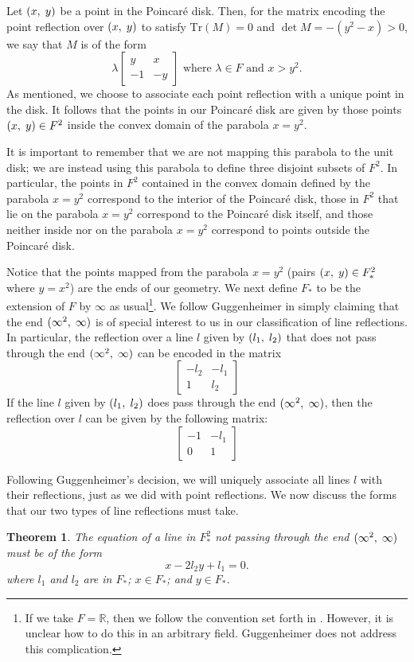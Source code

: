 \documentclass[12pt]{article}
\newcommand{\R}{\mathbb{R}}
\newcommand{\lftmat}[4]{\begin{bmatrix} {#1} & {#2} \\ {#3} & {#4} \end{bmatrix}}
\newcommand{\pointmat}[2]{\lftmat{{#2}}{{#1}}{-1}{-{#2}}}
\newcommand{\stanpointmat}{\pointmat{x}{y}}
\newcommand{\linenoendmat}[2]{\begin{bmatrix} -{#2} & -{#1} \\ 1 & {#2} \end{bmatrix}}
\newcommand{\stanlinenoendmat}{\linenoendmat{l_1}{l_2}}
\newcommand{\lineendmat}[2]{\begin{bmatrix} -1 & -{#1} \\ 0 & 1 \end{bmatrix}}
\newcommand{\stanlineendmat}{\lineendmat{l_1}{l_2}}
\newcommand{\ttc}{, \hspace{1mm}}
\newcommand{\poincare}{Poincar\'{e} }
\newcommand{\Tr}{\text{Tr}}
\newcommand{\specialend}{(\infty^2\ttc\infty)}
\theoremstyle{plain}
\newtheorem{theorem}{Theorem}[section]
\theoremstyle{definition}
\begin{document}
Let $(x \ttc y)$ be a point in the \poincare disk. Then, for the matrix encoding the point reflection over $(x \ttc y)$ to satisfy $\Tr(M) = 0$ and $\det M = -(y^2 - x) > 0$, we say that $M$ is of the form
\begin{equation} 
	\lambda \stanpointmat \text{ where } \lambda \in F \text{ and } x > y^2. 
\end{equation}	
As mentioned, we choose to associate each point reflection with a unique point in the disk. It follows that the points in our \poincare disk are given by those points $(x \ttc y) \in F^2$ inside the convex domain of the parabola $x = y^2$.

It is important to remember that we are not mapping this parabola to the unit disk; we are instead using this parabola to define three disjoint subsets of $F^2$. In particular, the points in $F^2$ contained in the convex domain defined by the parabola $x=y^2$ correspond to the interior of the \poincare disk, those in $F^2$ that lie on the parabola $x=y^2$ correspond to the \poincare disk itself, and those neither inside nor on the parabola $x=y^2$ correspond to points outside the \poincare disk.

Notice that the points mapped from the parabola $x = y^2$ (pairs $(x \ttc y) \in F_*^2$ where $y = x^2$) are the ends of our geometry. We next define $F_*$ to be the extension of $F$ by $\infty$ as usual\footnote{If we take $F = \R$, then we follow the convention set forth in \cite{shuman_infinity}. However, it is unclear how to do this in an arbitrary field. Guggenheimer does not address this complication.}. We follow Guggenheimer in simply claiming that the end $\specialend$ is of special interest to us in our classification of line reflections. In particular, the reflection over a line $l$ given by $(l_1\ttc l_2)$ that does not pass through the end $\specialend$ can be encoded in the matrix
\[\stanlinenoendmat\]
If the line $l$ given by $(l_1\ttc l_2)$ does pass through the end $\specialend$, then the reflection over $l$ can be given by the following matrix:
\[
	\stanlineendmat
\]

Following Guggenheimer's decision, we will uniquely associate all lines $l$ with their reflections, just as we did with point reflections. We now discuss the forms that our two types of line reflections must take.

\begin{theorem}The equation of a line in $F_*^2$ not passing through the end $\specialend$ must be of the form \begin{equation}
	x - 2l_2y + l_1  = 0.
\end{equation} 
where $l_1$ and $l_2$ are in $F_*$; $x \in F_*$; and $y \in F_*$.
\end{theorem}
\end{document}
